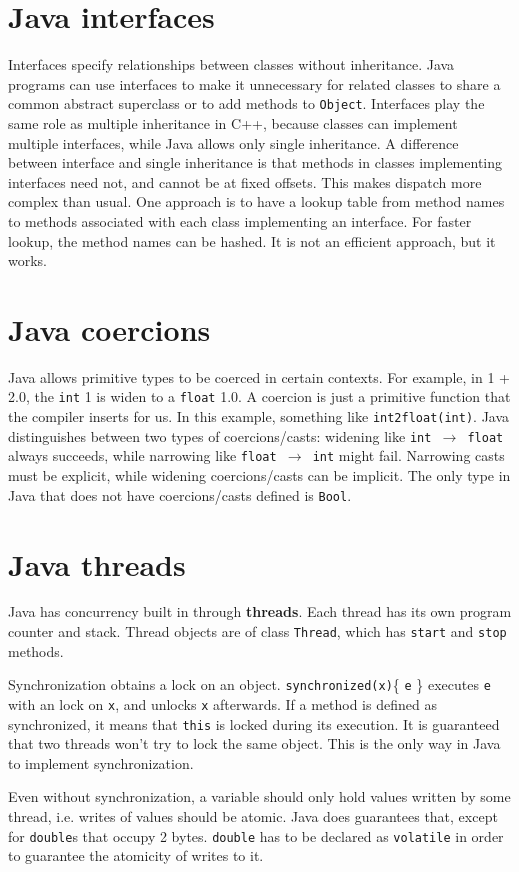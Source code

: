 \section{Java interfaces}
Interfaces specify relationships between classes without inheritance. Java programs can use interfaces to make it unnecessary for related classes to share a common abstract superclass or to add methods to \texttt{Object}. Interfaces play the same role as multiple inheritance in C++, because classes can implement multiple interfaces, while Java allows only single inheritance. A difference between interface and single inheritance is that methods in classes implementing interfaces need not, and cannot be at fixed offsets. This makes dispatch more complex than usual. One approach is to have a lookup table from method names to methods associated with each class implementing an interface. For faster lookup, the method names can be hashed. It is not an efficient approach, but it works. 
\section{Java coercions}
Java allows primitive types to be coerced in certain contexts. For example, in 1 + 2.0, the \texttt{int} 1 is widen to a \texttt{float} 1.0. A coercion is just a primitive function that the compiler inserts for us. In this example, something like \texttt{int2float(int)}. Java distinguishes between two types of coercions/casts: widening like \texttt{int $\rightarrow$ float} always succeeds, while narrowing like \texttt{float $\rightarrow$ int} might fail. Narrowing casts must be explicit, while widening coercions/casts can be implicit. The only type in Java that does not have coercions/casts defined is \texttt{Bool}.
\section{Java threads}
Java has concurrency built in through \textbf{threads}. Each thread has its own program counter and stack. Thread objects are of class \texttt{Thread}, which has \texttt{start} and \texttt{stop} methods.

Synchronization obtains a lock on an object. \texttt{synchronized(x)}\{ \texttt{e} \} executes \texttt{e} with an lock on \texttt{x}, and unlocks \texttt{x} afterwards. If a method is defined as synchronized, it means that \texttt{this} is locked during its execution. It is guaranteed that two threads won't try to lock the same object. This is the only way in Java to implement synchronization. 

Even without synchronization, a variable should only hold values written by some thread, i.e. writes of values should be atomic. Java does guarantees that, except for \texttt{double}s that occupy 2 bytes. \texttt{double} has to be declared as \texttt{volatile} in order to guarantee the atomicity of writes to it. 
\ifx\PREAMBLE\undefined

\fi